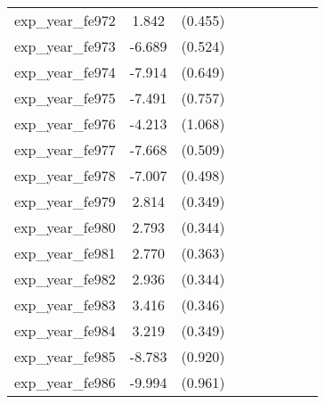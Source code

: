 {\begin{tabular}{l*{4}{cc}}
exp\_year\_fe972&    1.842\sym{***}&  (0.455)&                  &         &                  &         &                  &         \\
exp\_year\_fe973&   -6.689\sym{***}&  (0.524)&                  &         &                  &         &                  &         \\
exp\_year\_fe974&   -7.914\sym{***}&  (0.649)&                  &         &                  &         &                  &         \\
exp\_year\_fe975&   -7.491\sym{***}&  (0.757)&                  &         &                  &         &                  &         \\
exp\_year\_fe976&   -4.213\sym{***}&  (1.068)&                  &         &                  &         &                  &         \\
exp\_year\_fe977&   -7.668\sym{***}&  (0.509)&                  &         &                  &         &                  &         \\
exp\_year\_fe978&   -7.007\sym{***}&  (0.498)&                  &         &                  &         &                  &         \\
exp\_year\_fe979&    2.814\sym{***}&  (0.349)&                  &         &                  &         &                  &         \\
exp\_year\_fe980&    2.793\sym{***}&  (0.344)&                  &         &                  &         &                  &         \\
exp\_year\_fe981&    2.770\sym{***}&  (0.363)&                  &         &                  &         &                  &         \\
exp\_year\_fe982&    2.936\sym{***}&  (0.344)&                  &         &                  &         &                  &         \\
exp\_year\_fe983&    3.416\sym{***}&  (0.346)&                  &         &                  &         &                  &         \\
exp\_year\_fe984&    3.219\sym{***}&  (0.349)&                  &         &                  &         &                  &         \\
exp\_year\_fe985&   -8.783\sym{***}&  (0.920)&                  &         &                  &         &                  &         \\
exp\_year\_fe986&   -9.994\sym{***}&  (0.961)&                  &         &                  &         &                  &         \\

\end{tabular}}
